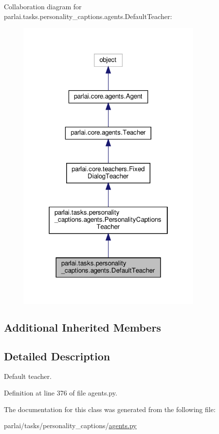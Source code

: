Collaboration diagram for parlai.\+tasks.\+personality\+\_\+captions.\+agents.\+Default\+Teacher\+:\nopagebreak
\begin{figure}[H]
\begin{center}
\leavevmode
\includegraphics[width=262pt]{d3/d59/classparlai_1_1tasks_1_1personality__captions_1_1agents_1_1DefaultTeacher__coll__graph}
\end{center}
\end{figure}
\subsection*{Additional Inherited Members}


\subsection{Detailed Description}
\begin{DoxyVerb}Default teacher.
\end{DoxyVerb}
 

Definition at line 376 of file agents.\+py.



The documentation for this class was generated from the following file\+:\begin{DoxyCompactItemize}
\item 
parlai/tasks/personality\+\_\+captions/\hyperlink{parlai_2tasks_2personality__captions_2agents_8py}{agents.\+py}\end{DoxyCompactItemize}
